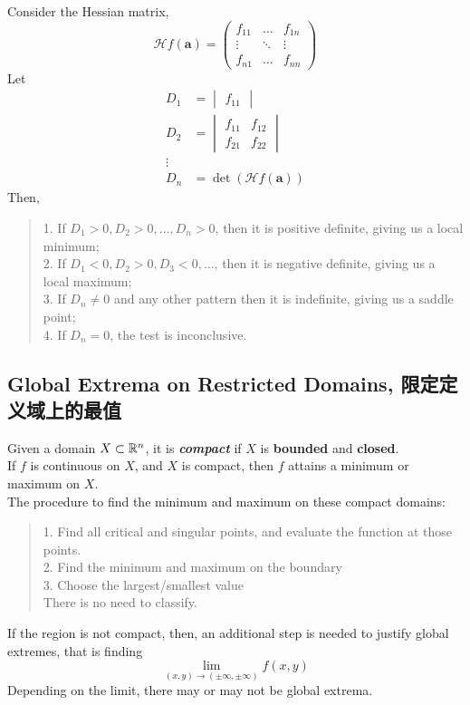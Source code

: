 Consider the Hessian matrix,
$$\mathscr{H}f(\textbf{a}) = \begin{pmatrix}
    f_{11} & \dots & f_{1n} \\
    \vdots & \ddots & \vdots \\
    f_{n1} & \dots & f_{nn}
\end{pmatrix}$$
Let
\begin{align*}
    D_1 &= \begin{vmatrix}
        f_{11}
    \end{vmatrix} \\
    D_2 &= \begin{vmatrix}
        f_{11} & f_{12} \\
        f_{21} & f_{22}
    \end{vmatrix} \\
    \vdots \\
    D_n &= \det (\mathscr{H}f(\textbf{a}))
\end{align*}
Then,
\begin{quote}
    1. If $D_1 > 0, D_2 > 0, \dots, D_n > 0$, then it is positive definite, giving us a local minimum; \\
    2. If $D_1 < 0, D_2 > 0, D_3 < 0, \dots$, then it is negative definite, giving us a local maximum; \\
    3. If $D_n \ne 0$ and any other pattern then it is indefinite, giving us a saddle point; \\
    4. If $D_n = 0$, the test is inconclusive.
\end{quote}

\subsection{Global Extrema on Restricted Domains, 限定定义域上的最值}
Given a domain $X \subset \mathbb{R}^n$, it is \textbf{\textit{compact}} if $X$ is \textbf{bounded} and \textbf{closed}. \\
If $f$ is continuous on $X$, and $X$ is compact, then $f$ attains a minimum or maximum on $X$. \\
The procedure to find the minimum and maximum on these compact domains:
\begin{quote}
    1. Find all critical and singular points, and evaluate the function at those points. \\
    2. Find the minimum and maximum on the boundary \\
    3. Choose the largest/smallest value \\
    There is no need to classify.
\end{quote}
If the region is not compact, then, an additional step is needed to justify global extremes, that is finding
$$\lim_{(x, y) \to (\pm \infty, \pm \infty)} f(x, y)$$
Depending on the limit, there may or may not be global extrema.

